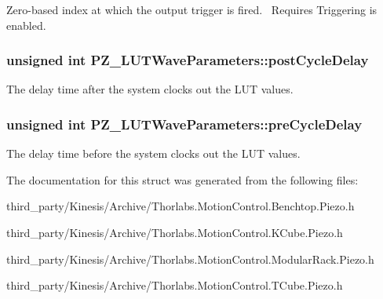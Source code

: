 Zero-\/based index at which the output trigger is fired.~\newline
 Requires Triggering is enabled. 

\subsubsection[{\texorpdfstring{post\+Cycle\+Delay}{postCycleDelay}}]{\setlength{\rightskip}{0pt plus 5cm}unsigned int P\+Z\+\_\+\+L\+U\+T\+Wave\+Parameters\+::post\+Cycle\+Delay}\hypertarget{struct_p_z___l_u_t_wave_parameters_aa99ac284feb8f7b64d14ad326877519f}{}\label{struct_p_z___l_u_t_wave_parameters_aa99ac284feb8f7b64d14ad326877519f}


The delay time after the system clocks out the L\+UT values. 

\subsubsection[{\texorpdfstring{pre\+Cycle\+Delay}{preCycleDelay}}]{\setlength{\rightskip}{0pt plus 5cm}unsigned int P\+Z\+\_\+\+L\+U\+T\+Wave\+Parameters\+::pre\+Cycle\+Delay}\hypertarget{struct_p_z___l_u_t_wave_parameters_a6bf977c7d80c340340d40a4194965dd8}{}\label{struct_p_z___l_u_t_wave_parameters_a6bf977c7d80c340340d40a4194965dd8}


The delay time before the system clocks out the L\+UT values. 



The documentation for this struct was generated from the following files\+:\begin{DoxyCompactItemize}
\item 
third\+\_\+party/\+Kinesis/\+Archive/Thorlabs.\+Motion\+Control.\+Benchtop.\+Piezo.\+h\item 
third\+\_\+party/\+Kinesis/\+Archive/Thorlabs.\+Motion\+Control.\+K\+Cube.\+Piezo.\+h\item 
third\+\_\+party/\+Kinesis/\+Archive/Thorlabs.\+Motion\+Control.\+Modular\+Rack.\+Piezo.\+h\item 
third\+\_\+party/\+Kinesis/\+Archive/Thorlabs.\+Motion\+Control.\+T\+Cube.\+Piezo.\+h\end{DoxyCompactItemize}
